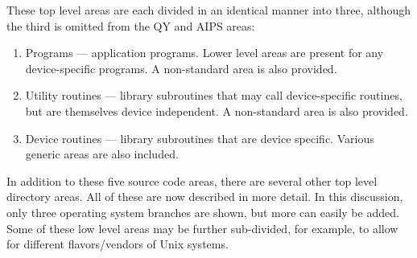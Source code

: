 These top level areas are each divided in an identical manner into
three, although the third is omitted from the QY and AIPS areas:
\begin{enumerate} %
\item Programs --- application programs. Lower level areas are present for any
device-specific programs.  A non-standard area is also provided.
\item Utility routines --- library subroutines that may call device-specific
routines, but are themselves device independent. A non-standard area
is also provided.
\item Device routines --- library subroutines that are device specific.
Various generic areas are also included.
\end{enumerate} %
In addition to these five source code areas, there are several other
top level directory areas. All of these are now described in more
detail. In this discussion, only three operating system branches are
shown, but more can easily be added. Some of these low level areas may
be further sub-divided, for example, to allow for different
flavors/vendors of Unix systems.


